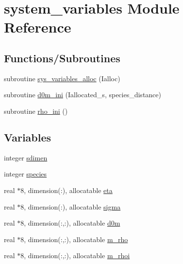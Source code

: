 \hypertarget{namespacesystem__variables}{}\section{system\+\_\+variables Module Reference}
\label{namespacesystem__variables}
\subsection*{Functions/\+Subroutines}
\begin{DoxyCompactItemize}
\item 
subroutine \hyperlink{namespacesystem__variables_a3582be6e12e8f8384b74e0cb1e095638}{sys\+\_\+variables\+\_\+alloc} (Ialloc)
\item 
subroutine \hyperlink{namespacesystem__variables_a2b1ed9ba21b87d2d006960362d8d866f}{d0m\+\_\+ini} (Iallocated\+\_\+s, species\+\_\+distance)
\item 
subroutine \hyperlink{namespacesystem__variables_a58dd4f7b930f29e7933128856a80d088}{rho\+\_\+ini} ()
\end{DoxyCompactItemize}
\subsection*{Variables}
\begin{DoxyCompactItemize}
\item 
integer \hyperlink{namespacesystem__variables_a6daf314984d1b1af3add98d0183cece5}{sdimen}
\item 
integer \hyperlink{namespacesystem__variables_a5cbe3284a50e8855776c84f6ab36a0b9}{species}
\item 
real $\ast$8, dimension(\+:), allocatable \hyperlink{namespacesystem__variables_abace0b1eb27d0ed93f6d602742b93d64}{eta}
\item 
real $\ast$8, dimension(\+:), allocatable \hyperlink{namespacesystem__variables_ab27965e02d46e50bab5fa0a5cfc3cab8}{sigma}
\item 
real $\ast$8, dimension(\+:,\+:), allocatable \hyperlink{namespacesystem__variables_af9b49bbada067d17e1aa9feb7bde1237}{d0m}
\item 
real $\ast$8, dimension(\+:,\+:), allocatable \hyperlink{namespacesystem__variables_a29f67834297ad2a3ff687b92a32131d2}{m\+\_\+rho}
\item 
real $\ast$8, dimension(\+:,\+:), allocatable \hyperlink{namespacesystem__variables_a4037c2d31c4f9b732833108921967a0d}{m\+\_\+rhoi}
\end{DoxyCompactItemize}


